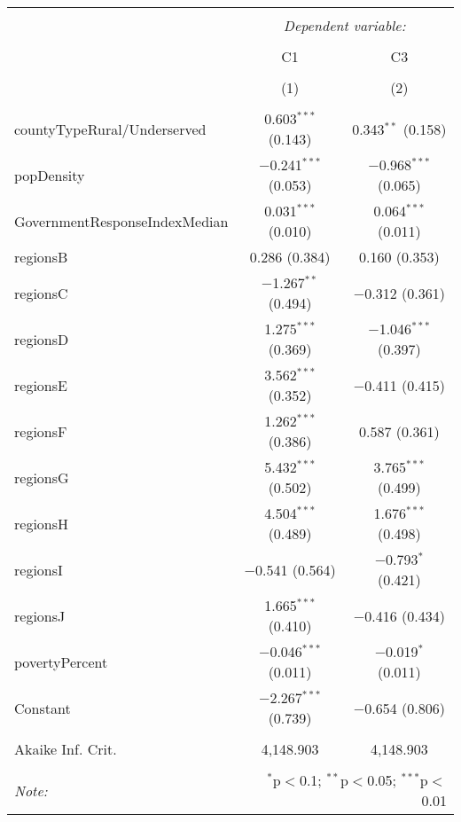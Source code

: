 
\begin{table}[!htbp] \centering 
  \caption{} 
  \label{} 
\begin{tabular}{@{\extracolsep{5pt}}lcc} 
\\[-1.8ex]\hline 
\hline \\[-1.8ex] 
 & \multicolumn{2}{c}{\textit{Dependent variable:}} \\ 
\cline{2-3} 
\\[-1.8ex] & C1 & C3 \\ 
\\[-1.8ex] & (1) & (2)\\ 
\hline \\[-1.8ex] 
 countyTypeRural/Underserved & 0.603$^{***}$ (0.143) & 0.343$^{**}$ (0.158) \\ 
  popDensity & $-$0.241$^{***}$ (0.053) & $-$0.968$^{***}$ (0.065) \\ 
  GovernmentResponseIndexMedian & 0.031$^{***}$ (0.010) & 0.064$^{***}$ (0.011) \\ 
  regionsB & 0.286 (0.384) & 0.160 (0.353) \\ 
  regionsC & $-$1.267$^{**}$ (0.494) & $-$0.312 (0.361) \\ 
  regionsD & 1.275$^{***}$ (0.369) & $-$1.046$^{***}$ (0.397) \\ 
  regionsE & 3.562$^{***}$ (0.352) & $-$0.411 (0.415) \\ 
  regionsF & 1.262$^{***}$ (0.386) & 0.587 (0.361) \\ 
  regionsG & 5.432$^{***}$ (0.502) & 3.765$^{***}$ (0.499) \\ 
  regionsH & 4.504$^{***}$ (0.489) & 1.676$^{***}$ (0.498) \\ 
  regionsI & $-$0.541 (0.564) & $-$0.793$^{*}$ (0.421) \\ 
  regionsJ & 1.665$^{***}$ (0.410) & $-$0.416 (0.434) \\ 
  povertyPercent & $-$0.046$^{***}$ (0.011) & $-$0.019$^{*}$ (0.011) \\ 
  Constant & $-$2.267$^{***}$ (0.739) & $-$0.654 (0.806) \\ 
 \hline \\[-1.8ex] 
Akaike Inf. Crit. & 4,148.903 & 4,148.903 \\ 
\hline 
\hline \\[-1.8ex] 
\textit{Note:}  & \multicolumn{2}{r}{$^{*}$p$<$0.1; $^{**}$p$<$0.05; $^{***}$p$<$0.01} \\ 
\end{tabular} 
\end{table} 
